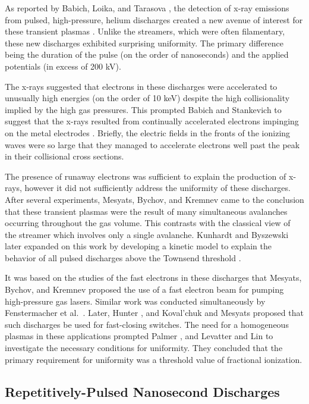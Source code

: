 As reported by Babich, Loika, and Tarasova \cite{Babich1977}, the detection of
x-ray emissions from pulsed, high-pressure, helium discharges created a new
avenue of interest for these transient plasmas \cite{Stankevich1967,
Noggle1968}. Unlike the streamers, which were often filamentary, these new
discharges exhibited surprising uniformity. The primary difference being the
duration of the pulse (on the order of nanoseconds) and the applied potentials
(in excess of 200 kV).

The x-rays suggested that electrons in these discharges were accelerated to
unusually high energies (on the order of 10 keV) despite the high collisionality
implied by the high gas pressures. This prompted Babich and Stankevich to
suggest that the x-rays resulted from continually accelerated electrons
impinging on the metal electrodes \cite{Babich1973}. Briefly, the electric
fields in the fronts of the ionizing waves were so large that they managed to
accelerate electrons well past the peak in their collisional cross sections.

The presence of runaway electrons was sufficient to explain the production of
x-rays, however it did not sufficiently address the uniformity of these
discharges. After several experiments, Mesyats, Bychov, and Kremnev came to the
conclusion that these transient plasmas were the result of many simultaneous
avalanches occurring throughout the gas volume. This contrasts with the
classical view of the streamer which involves only a single avalanche. Kunhardt
and Byszewski later expanded on this work by developing a kinetic model to
explain the behavior of all pulsed discharges above the Townsend threshold
\cite{Kunhardt1980}.

It was based on the studies of the fast electrons in these discharges that
Mesyats, Bychov, and Kremnev proposed the use of a fast electron beam for
pumping high-pressure gas lasers. Similar work was conducted simultaneously by
Fenstermacher et al.~\cite{Fenstermacher1972}. Later, Hunter \cite{Hunter1976},
and Koval'chuk and Mesyats \cite{Koval'chuk1976} proposed that such discharges
be used for fast-closing switches. The need for a homogeneous plasmas in these
applications prompted Palmer \cite{Palmer1974}, and Levatter and Lin
\cite{Levatter1980} to investigate the necessary conditions for uniformity. They
concluded that the primary requirement for uniformity was a threshold value of
fractional ionization.

\subsection{Repetitively-Pulsed Nanosecond Discharges}

